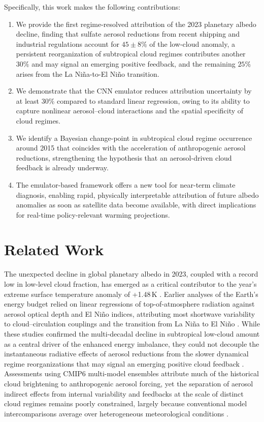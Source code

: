 \documentclass{article}
\begin{document}
Specifically, this work makes the following contributions:
\begin{enumerate}
    \item We provide the first regime-resolved attribution of the 2023 planetary albedo decline, finding that sulfate aerosol reductions from recent shipping and industrial regulations account for $45 \pm 8\%$ of the low-cloud anomaly, a persistent reorganization of subtropical cloud regimes contributes another $30\%$ and may signal an emerging positive feedback, and the remaining $25\%$ arises from the La Ni\~na-to-El Ni\~no transition.
    \item We demonstrate that the CNN emulator reduces attribution uncertainty by at least $30\%$ compared to standard linear regression, owing to its ability to capture nonlinear aerosol–cloud interactions and the spatial specificity of cloud regimes.
    \item We identify a Bayesian change-point in subtropical cloud regime occurrence around 2015 that coincides with the acceleration of anthropogenic aerosol reductions, strengthening the hypothesis that an aerosol-driven cloud feedback is already underway.
    \item The emulator-based framework offers a new tool for near-term climate diagnosis, enabling rapid, physically interpretable attribution of future albedo anomalies as soon as satellite data become available, with direct implications for real-time policy-relevant warming projections.
\end{enumerate}

\section{Related Work}

The unexpected decline in global planetary albedo in 2023, coupled with a record low in low-level cloud fraction, has emerged as a critical contributor to the year's extreme surface temperature anomaly of +1.48\,K \cite{Goessling2024_albedo2023,Loeb2024_CERES}. Earlier analyses of the Earth's energy budget relied on linear regressions of top-of-atmosphere radiation against aerosol optical depth and El Ni\~{n}o indices, attributing most shortwave variability to cloud–circulation couplings and the transition from La Ni\~{n}a to El Ni\~{n}o \cite{Loeb2021_energy_imbalance,Brown2021_ENSO_clouds}. While these studies confirmed the multi-decadal decline in subtropical low-cloud amount as a central driver of the enhanced energy imbalance, they could not decouple the instantaneous radiative effects of aerosol reductions from the slower dynamical regime reorganizations that may signal an emerging positive cloud feedback \cite{Zhou2004_lowcloud_SST,Wood2012_stratocumulus,Schneider2019_cloud_regimes}. Assessments using CMIP6 multi-model ensembles attribute much of the historical cloud brightening to anthropogenic aerosol forcing, yet the separation of aerosol indirect effects from internal variability and feedbacks at the scale of distinct cloud regimes remains poorly constrained, largely because conventional model intercomparisons average over heterogeneous meteorological conditions \cite{Gryspeerdt2019_aerosol_cloud_confounding,Bellouin2020_anthropogenic_forcing,Forster2021_IPCC_ch7}.
\end{document}
